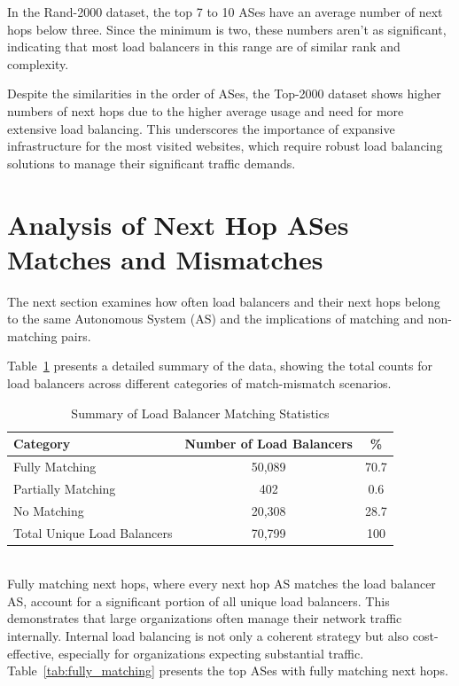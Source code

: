 \documentclass[12pt]{cwru_thesis}
\begin{document}
In the Rand-2000 dataset, the top 7 to 10 ASes have an average number of next hops below three. Since the minimum is two, these numbers aren't as significant, indicating that most load balancers in this range are of similar rank and complexity.

Despite the similarities in the order of ASes, the Top-2000 dataset shows higher numbers of next hops due to the higher average usage and need for more extensive load balancing. This underscores the importance of expansive infrastructure for the most visited websites, which require robust load balancing solutions to manage their significant traffic demands.

\newpage
\section{Analysis of Next Hop ASes Matches and Mismatches}

The next section examines how often load balancers and their next hops belong to the same Autonomous System (AS) and the implications of matching and non-matching pairs.

Table~\ref{tab:summary_data} presents a detailed summary of the data, showing the total counts for load balancers across different categories of match-mismatch scenarios.\\

\begin{table}[h!]
\centering
\begin{tabular}{|l|c|c|}
\hline
\textbf{Category} & \textbf{Number of Load Balancers} & \textbf{\%} \\
\hline
Fully Matching & 50,089 & 70.7 \\
Partially Matching & 402 & 0.6 \\
No Matching & 20,308 & 28.7 \\
\hline
Total Unique Load Balancers & 70,799 & 100 \\
\hline
\end{tabular}
\caption{Summary of Load Balancer Matching Statistics}
\label{tab:summary_data}
\end{table}
 \\ 


Fully matching next hops, where every next hop AS matches the load balancer AS, account for a significant portion of all unique load balancers. This demonstrates that large organizations often manage their network traffic internally. Internal load balancing is not only a coherent strategy but also cost-effective, especially for organizations expecting substantial traffic. Table~\ref{tab:fully_matching} presents the top ASes with fully matching next hops. 
\end{document}
